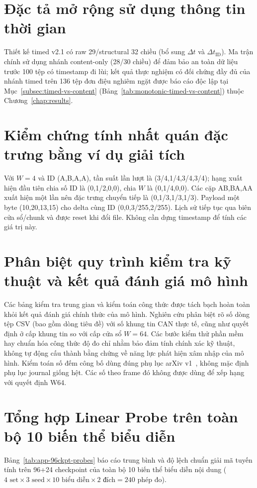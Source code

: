 \documentclass[12pt, a4paper, reqno, oneside]{book}
\begin{document}
\section{Đặc tả mở rộng sử dụng thông tin thời gian}
Thiết kế timed v2.1 có raw 29/structural 32 chiều (bổ sung $\Delta t$ và $\Delta t_{\text{ID}}$). Ma trận chính sử dụng nhánh content-only (28/30 chiều) để đảm bảo an toàn dữ liệu trước 100 tệp có timestamp đi lùi; kết quả thực nghiệm có đối chứng đầy đủ của nhánh timed trên 136 tệp đơn điệu nghiêm ngặt được báo cáo độc lập tại Mục~\ref{subsec:timed-vs-content} (Bảng~\ref{tab:monotonic-timed-vs-content}) thuộc Chương~\ref{chap:results}.
\section{Kiểm chứng tính nhất quán đặc trưng bằng ví dụ giải tích}
Với $W=4$ và ID (A,B,A,A), tần suất lần lượt là (3/4,1/4,3/4,3/4); hạng xuất hiện đầu tiên chia số ID là (0,1/2,0,0), chia $W$ là (0,1/4,0,0). Các cặp AB,BA,AA xuất hiện một lần nên đặc trưng chuyển tiếp là (0,1/3,1/3,1/3). Payload một byte (10,20,13,15) cho delta cùng ID (0,0,3/255,2/255). Lịch sử tiếp tục qua biên cửa sổ/chunk và được reset khi đổi file. Không cần dựng timestamp để tính các giá trị này.
\section{Phân biệt quy trình kiểm tra kỹ thuật và kết quả đánh giá mô hình}
Các bảng kiểm tra trung gian và kiểm toán công thức được tách bạch hoàn toàn khỏi kết quả đánh giá chính thức của mô hình. Nghiên cứu phân biệt rõ số dòng tệp CSV (bao gồm dòng tiêu đề) với số khung tin CAN thực tế, cũng như quyết định ở cấp khung tin so với cấp cửa sổ $W=64$. Các bước kiểm thử phần mềm hay chuẩn hóa công thức độ đo chỉ nhằm bảo đảm tính chính xác kỹ thuật, không tự động cấu thành bằng chứng về năng lực phát hiện xâm nhập của mô hình.
Kiểm toán số đếm công bố dùng đúng phụ lục arXiv v1~\cite{lampe2023appendix}, không mặc định phụ lục journal giống hệt. Các số theo frame đó không được dùng để xếp hạng với quyết định W64.

\section{Tổng hợp Linear Probe trên toàn bộ 10 biến thể biểu diễn}\label{sec:app-96ckpt-probes}
Bảng~\ref{tab:app-96ckpt-probes} báo cáo trung bình và độ lệch chuẩn giải mã tuyến tính trên 96+24 checkpoint của toàn bộ 10 biến thể biểu diễn nội dung ($4\text{ set} \times 3\text{ seed} \times 10\text{ biểu diễn} \times 2\text{ đích} = 240$ phép đo).
\end{document}
